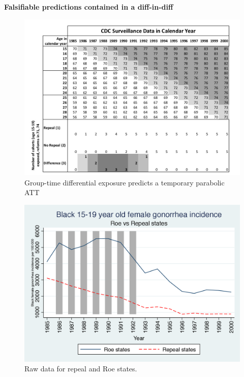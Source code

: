\documentclass[notes=show]{beamer}
\begin{document}
\begin{frame}[plain]

\begin{center}
\textbf{Falsifiable predictions contained in a diff-in-diff}
\end{center}

\begin{figure}
	\includegraphics[scale=0.25]{./lecture_includes/cohort_id.jpg}
	\caption{Group-time differential exposure predicts a temporary parabolic ATT}
	\end{figure}

\end{frame}

\begin{frame}[plain]

	\begin{figure}
	\includegraphics[scale=0.6]{./lecture_includes/bf15_dd-.png}
	\caption{Raw data for repeal and Roe states.}
	\end{figure}

\end{frame}
\end{document}
